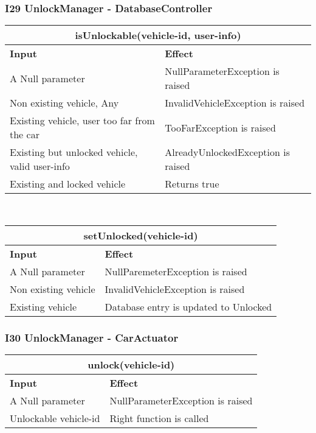 \subsubsection{I29 UnlockManager - DatabaseController} 
\begin{tabular}{|p{5cm}|p{7cm}|}
\hline
\multicolumn{2}{|c|}{isUnlockable(vehicle-id, user-info)}\\
\hline
\textbf{Input} & \textbf{Effect}\\

\hline
A Null parameter & NullParameterException is raised \\

\hline
Non existing vehicle, Any & InvalidVehicleException is raised\\

\hline
Existing vehicle, user too far from the car & TooFarException is raised\\

\hline
Existing but unlocked vehicle, valid user-info & AlreadyUnlockedException is raised\\

\hline
Existing and locked vehicle & Returns true\\
\hline
\end{tabular}
\\
\begin{tabular}{|p{5cm}|p{7cm}|}
\hline
\multicolumn{2}{|c|}{setUnlocked(vehicle-id)}\\
\hline
\textbf{Input} & \textbf{Effect}\\

\hline
A Null parameter & NullParemeterException is raised \\

\hline
Non existing vehicle & InvalidVehicleException is raised\\

\hline
Existing vehicle & Database entry is updated to Unlocked \\
\hline
\end{tabular}

\subsubsection{I30 UnlockManager - CarActuator} 
\begin{tabular}{|p{5cm}|p{7cm}|}
\hline
\multicolumn{2}{|c|}{unlock(vehicle-id)}\\
\hline
\textbf{Input} & \textbf{Effect}\\

\hline
A Null parameter & NullParameterException is raised \\

\hline
Unlockable vehicle-id & Right function is called\\
\hline
\end{tabular}

